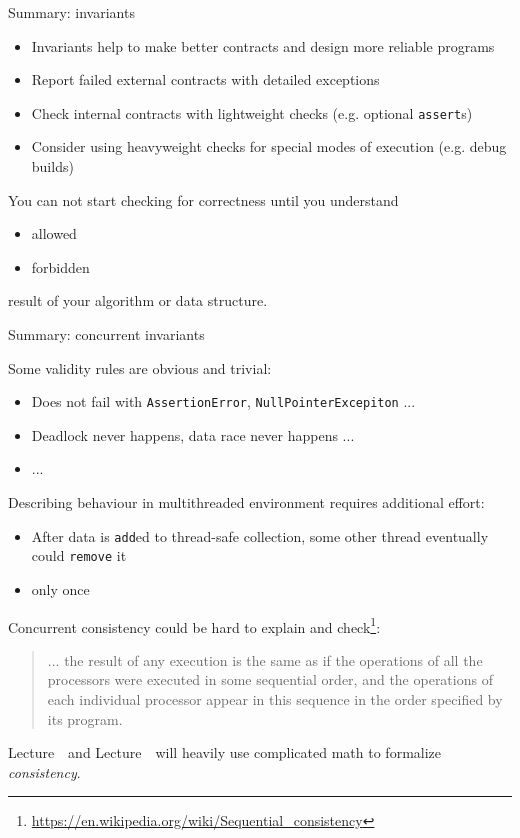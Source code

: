 \begin{frame}{Summary: invariants}

\begin{itemize}
  \item Invariants help to make better contracts and design more reliable programs
  \item Report failed external contracts with detailed exceptions
  \item Check internal contracts with lightweight checks (e.g. optional \texttt{assert}s)
  \item Consider using heavyweight checks for special modes of execution (e.g. debug builds)
\end{itemize}

\pause

You can not start checking for correctness until you understand 
\begin{itemize}
  \item allowed
  \item forbidden
\end{itemize}
result of your algorithm or data structure.

\end{frame}


\begin{frame}{Summary: concurrent invariants}

Some validity rules are obvious and trivial:
\begin{itemize}
  \item Does not fail with \texttt{AssertionError}, \texttt{NullPointerExcepiton} ...
  \item Deadlock never happens, data race never happens ...
  \item ...
\end{itemize}

\pause

Describing behaviour in multithreaded environment requires additional effort:
\begin{itemize}
  \item After data is \texttt{add}ed to thread-safe collection, some other thread eventually could \texttt{remove} it
  \pause
  \item only once
\end{itemize}

\pause

Concurrent consistency could be hard to explain and check\footnote<4->{\tiny\url{https://en.wikipedia.org/wiki/Sequential_consistency}}:
\begin{quote}
  ... the result of any execution is the same as if the operations of all the processors were executed in some sequential order, and the operations of each individual processor appear in this sequence in the order specified by its program.
\end{quote}

\pause
Lecture~\foundationsNum \ and Lecture~\foundationsPlusNum \ will heavily use complicated math to formalize \textit{consistency}.

\end{frame}

